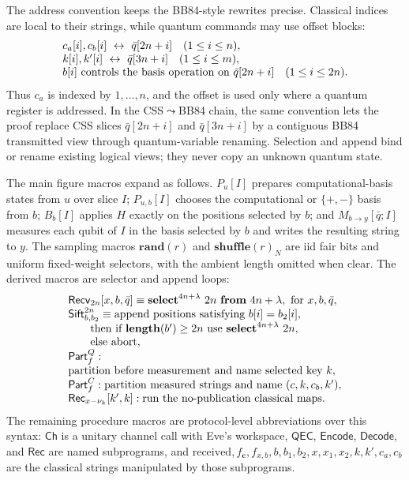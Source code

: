 \documentclass[conference,compsoc]{IEEEtran}
\newcommand{\bb}{\textsf{BB84}\xspace}
\begin{document}
The address convention keeps the \bb-style rewrites precise. Classical indices
are local to their strings, while quantum commands may use offset blocks:
\[
\begin{array}{@{}l@{}}
c_a[i],c_b[i]\ \leftrightarrow\ \bar q[2n+i]\quad(1\le i\le n),\\
k[i],k'[i]\ \leftrightarrow\ \bar q[3n+i]\quad(1\le i\le m),\\
b[i]\ \text{controls the basis operation on}\ \bar q[2n+i]\quad(1\le i\le 2n).
\end{array}
\]
Thus \(c_a\) is indexed by \(1,\ldots,n\), and the offset is used only where a
quantum register is addressed. In the CSS$\leadsto$\bb chain, the same
convention lets the proof replace CSS slices \(\bar q[2n+i]\) and
\(\bar q[3n+i]\) by a contiguous \bb transmitted view through quantum-variable
renaming. Selection and append bind or rename existing logical views; they never
copy an unknown quantum state.

The main figure macros expand as follows. \(P_u[I]\) prepares
computational-basis states from \(u\) over slice \(I\);
\(P_{u,b}[I]\) chooses the computational or \(\{+,-\}\) basis from \(b\);
\(B_b[I]\) applies \(H\) exactly on the positions selected by \(b\); and
\(M_{b\to y}[\bar q;I]\) measures each qubit of \(I\) in the basis selected by
\(b\) and writes the resulting string to \(y\). The sampling macros
\(\mathbf{rand}(r)\) and \(\mathbf{shuffle}(r)_N\) are iid fair bits and uniform
fixed-weight selectors, with the ambient length omitted when clear. The derived
macros are selector and append loops:
\[
\begin{array}{@{}l@{}}
\mathsf{Recv}_{2n}[x,b,\bar q]\equiv
  \mathbf{select}^{4n+\lambda}\ 2n\ \mathbf{from}\ 4n+\lambda,\ \text{for }x,b,\bar q,\\
\mathsf{Sift}^{2n}_{b,b_2}\equiv
  \text{append positions satisfying }b[i]=b_2[i],\\
  \qquad\text{then if }\mathbf{length}(b')\ge2n\text{ use }\mathbf{select}^{4n+\lambda}\ 2n,\\
  \qquad\text{else abort},\\
\mathsf{Part}^{Q}_{f}: \\\text{partition before measurement and name selected key }k,\\
\mathsf{Part}^{C}_{f}: \text{partition measured strings and name }(c,k,c_b,k'),\\
\mathsf{Rec}_{x-\nu_k}[k',k]: \text{run the no-publication classical maps}.
\end{array}
\]
The remaining procedure macros are protocol-level abbreviations over this
syntax: \(\mathsf{Ch}\) is a unitary channel call with Eve's workspace,
\(\mathsf{QEC}\), \(\mathsf{Encode}\), \(\mathsf{Decode}\), and
\(\mathsf{Rec}\) are named subprograms, and
\(\mathrm{received},f_{\mathbf c},f_{x,b},b,b_1,b_2,x,x_1,x_2,k,k',c_a,c_b\)
are the classical strings manipulated by those subprograms.
\end{document}
